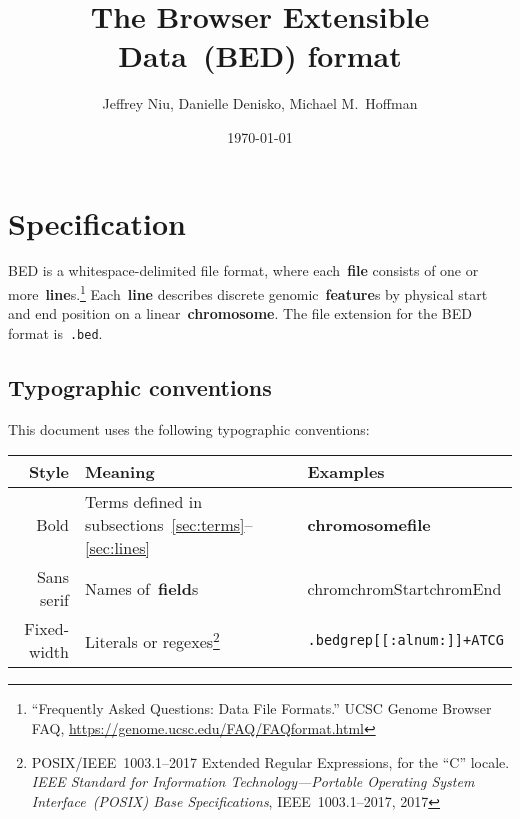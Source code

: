 \documentclass[11pt]{article}
\title{The Browser Extensible Data~(BED) format}
\author{Jeffrey Niu, Danielle Denisko, Michael M.~Hoffman}
\date{\today}
\begin{document}
\makeatletter
\renewcommand*{\AC@hyperlink}[2]{#2} %
\makeatother


\frenchspacing

\maketitle


\section{Specification}

\Ac{BED} is a whitespace-delimited file format, where each~\textbf{file} consists of one or more~\textbf{line}s.\footnote{``Frequently Asked Questions: Data File Formats.'' \ac{UCSC} Genome Browser FAQ, \url{https://genome.ucsc.edu/FAQ/FAQformat.html}}
Each~\textbf{line} describes discrete genomic~\textbf{feature}s by physical start and end position on a linear~\textbf{chromosome}.
The file extension for the \ac{BED} format is~\texttt{.bed}.

\subsection{Typographic conventions}

This document uses the following typographic conventions:

\vspace{2ex}

\noindent
\begin{tabularx}{\textwidth}{r L L}
  \toprule
  Style & Meaning & Examples \\
  \midrule
  Bold & Terms defined in subsections~\ref{sec:terms}--\ref{sec:lines} & \textbf{chromosome}{\quad}\textbf{file} \\
  Sans serif & Names of~\textbf{field}s & \textsf{chrom}{\quad}\textsf{chromStart}{\quad}\textsf{chromEnd} \\
  Fixed-width & Literals or \ac{regex}es\footnote{POSIX/IEEE~1003.1--2017 Extended Regular Expressions, for the ``C'' locale.
                \emph{IEEE Standard for Information Technology---Portable Operating System Interface~(POSIX) Base Specifications}, IEEE~1003.1--2017, 2017} & \texttt{.bed}{\quad}\texttt{grep}{\quad}\texttt{[[:alnum:]]+}{\quad}\texttt{ATCG} \\
  \bottomrule
\end{tabularx}
\end{document}
